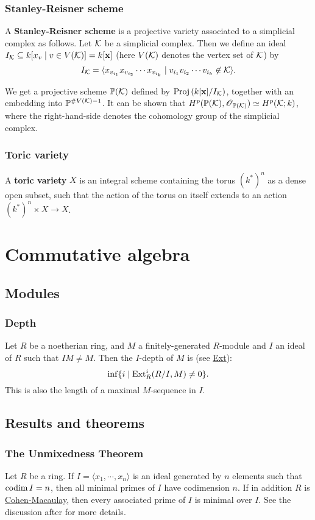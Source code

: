 \documentclass[11pt, english]{article}
\begin{document}
\subsubsection{Stanley-Reisner scheme}
\label{srscheme}

A \textbf{Stanley-Reisner scheme} is a projective variety associated to a simplicial complex as follows. Let $\mathcal K$ be a simplicial complex. Then we define an ideal $I_\mathcal K \subseteq k[x_v \mid v \in V(\mathcal K)] = k[\mathbf x]$ (here $V(\mathcal K)$ denotes the vertex set of $\mathcal K$) by
\[
I_\mathcal K = \langle x_{v_{i_1}}x_{v_{i_2}}\cdots x_{v_{i_k}} \mid v_{i_1}v_{i_2}\cdots v_{i_k} \not \in \mathcal K \rangle.
\]

We get a projective scheme $\mathbb{P}(\mathcal K)$ defined by $\operatorname{Proj} \left (k[ \mathbf x]/I_\mathcal K \right)$, together with an embedding into $\mathbb{P}^{\# V(\mathcal K)-1}$. It can be shown that $H^p(\mathbb{P}(\mathcal K),\operatorname{\mathscr{O}}_{\mathbb{P}(\mathcal K)}) \simeq H^p(\mathcal K;k)$, where the right-hand-side denotes the cohomology group of the simplicial complex.

\subsubsection{Toric variety}
\label{toricvariety}

A \textbf{toric variety} $X$ is an integral scheme containing the torus $(k^\ast)^n$ as a dense open subset, such that the action of the torus on itself extends to an action $(k^\ast)^n \times X \to X$.

\section{Commutative algebra}
\subsection{Modules}
\subsubsection{Depth}
Let $R$ be a noetherian ring, and $M$ a finitely-generated $R$-module and $I$ an ideal of $R$ such that $IM \neq M$. Then the $I$-depth of $M$ is (see \hyperref[ext]{Ext}): \[\inf\{i \mid \operatorname{\mathrm{Ext}}^i_R(R/I,M) \neq 0\}.\]
This is also the length of a maximal $M$-sequence in $I$.

\subsection{Results and theorems}
\subsubsection{The Unmixedness Theorem}
Let $R$ be a ring. If $I=\langle x_1,\cdots,x_n\rangle $ is an ideal generated by $n$ elements such that $\operatorname{codim} I=n$, then all minimal primes of $I$ have codimension $n$. If in addition $R$ is \hyperref[cmring]{Cohen-Macaulay}, then every associated prime of $I$ is minimal over $I$. See the discussion after \cite[Corollary 18.14]{eisenbud} for more details. 
\end{document}
